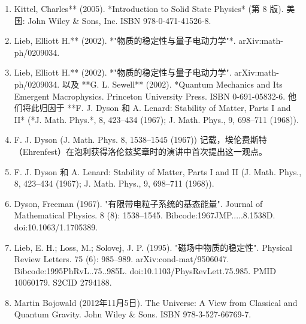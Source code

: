 \begin{enumerate}
\item Kittel, Charles** (2005). *Introduction to Solid State Physics* (第 8 版). 美国: John Wiley & Sons, Inc. ISBN 978-0-471-41526-8.  
\item Lieb, Elliott H.** (2002). *"物质的稳定性与量子电动力学"*. arXiv:math-ph/0209034.  
\item Lieb, Elliott H.** (2002). *"物质的稳定性与量子电动力学". arXiv:math-ph/0209034. 以及 **G. L. Sewell** (2002). *Quantum Mechanics and Its Emergent Macrophysics. Princeton University Press. ISBN 0-691-05832-6. 他们将此归因于 **F. J. Dyson 和 A. Lenard: Stability of Matter, Parts I and II* (*J. Math. Phys.*, 8, 423–434 (1967); J. Math. Phys., 9, 698–711 (1968)).  
\item F. J. Dyson (J. Math. Phys. 8, 1538–1545 (1967)) 记载，埃伦费斯特（Ehrenfest）在泡利获得洛伦兹奖章时的演讲中首次提出这一观点。  
\item F. J. Dyson 和 A. Lenard: Stability of Matter, Parts I and II (J. Math. Phys., 8, 423–434 (1967); J. Math. Phys., 9, 698–711 (1968)).  
\item Dyson, Freeman (1967). "有限带电粒子系统的基态能量". Journal of Mathematical Physics. 8 (8): 1538–1545. Bibcode:1967JMP.....8.1538D. doi:10.1063/1.1705389.  
\item Lieb, E. H.; Loss, M.; Solovej, J. P. (1995). "磁场中物质的稳定性". Physical Review Letters. 75 (6): 985–989. arXiv:cond-mat/9506047. Bibcode:1995PhRvL..75..985L. doi:10.1103/PhysRevLett.75.985. PMID 10060179. S2CID 2794188.  
\item Martin Bojowald (2012年11月5日). The Universe: A View from Classical and Quantum Gravity. John Wiley & Sons. ISBN 978-3-527-66769-7.
\end{enumerate}